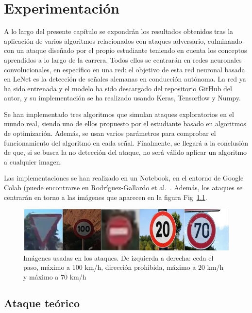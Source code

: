 
\chapter{Experimentación}
\label{cap:capitulo4}

A lo largo del presente capítulo se expondrán los resultados obtenidos tras la aplicación de varios algoritmos relacionados con ataques adversario, culminando con un ataque diseñado por el propio estudiante teniendo en cuenta los conceptos aprendidos a lo largo de la carrera. Todos ellos se centrarán en redes neuronales convolucionales, en específico en una red: el objetivo de esta red neuronal basada en LeNet es la detección de señales alemanas en conducción autónoma. La red ya ha sido entrenada y el modelo ha sido descargado del repositorio GitHub del autor, y su implementación se ha realizado usando Keras, Tensorflow y Numpy.

Se han implementado tres algoritmos que simulan ataques exploratorios en el mundo real, siendo uno de ellos propuesto por el estudiante basado en algoritmos de optimización. Además, se usan varios parámetros para comprobar el funcionamiento del algoritmo en cada señal. Finalmente, se llegará a la conclusión de que, si se busca la no detección del ataque, no será válido aplicar un algoritmo a cualquier imagen.

Las implementaciones se han realizado en un Notebook, en el entorno de Google Colab (puede encontrarse en Rodríguez-Gallardo et al.~\cite{MiGithub}. Además, los ataques se centrarán en torno a las imágenes que aparecen en la figura Fig~\ref{fig:senales_limpias}.


\begin{figure}[h]
    \centering
        \centering
        \includegraphics[width=\textwidth]{img/todas_senales_limpias.png}
        \caption{Imágenes usadas en los ataques. De izquierda a derecha: ceda el paso, máximo a $100$ km/h, dirección prohibida, máximo a $20$ km/h y máximo a $70$ km/h}
        \label{fig:senales_limpias}
\end{figure}

\section{Ataque teórico}

